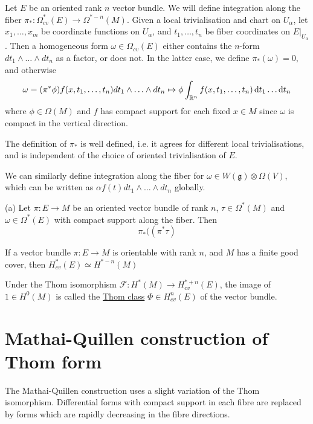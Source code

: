 Let $E$ be an oriented rank  $n$ vector bundle. We will define integration along
the fiber $\pi_* : \Omega^*_{cv}(E) \to \Omega^{*-n}(M)$. 
Given a local trivialisation and chart on $U_\alpha$, let $x_1,\ldots,x_m$ be 
coordinate functions on $U_\alpha$, and  $t_1,\ldots,t_n$ be fiber coordinates
on $E|_{U_{\alpha}}$. Then a homogeneous form $\omega\in \Omega_{cv}(E)$ either 
contains the $n$-form  $dt_1\wedge \ldots\wedge dt_n$ as a factor, or does not. 
In the latter case, we define $\pi_*(\omega) = 0$, and otherwise 
\[
\omega = (\pi^*\phi)f(x,t_1,\ldots,t_n)dt_1\wedge\ldots\wedge dt_n
\mapsto \phi\int_{\mathbb{R}^n} f(x,t_1,\ldots,t_n) \odif{t_1}\ldots\odif{t_n}
\] 
where $\phi\in\Omega(M)$ and  $f$ has compact support for each fixed  $x\in M$
since  $\omega$ is compact in the vertical direction. 

The definition of $\pi_*$ is well defined, i.e. it agrees for different local
trivialisations, and is independent of the choice of oriented trivialisation of
 $E$. %


We can similarly define integration along the fiber for $\omega\in
W(\mathfrak{g})\otimes \Omega(V)$, which can be written as $\alpha
f(t)dt_1\wedge\ldots\wedge dt_n$ globally.


\begin{prop} %
	(a) Let $\pi : E \to M$ be an oriented vector bundle of rank  $n$,
	$\tau\in\Omega^*(M)$ and  $\omega\in \Omega^*(E)$ with compact support
	along the fiber. Then 
	 \[
	\pi_*((\pi^*\tau)  
	\] 
\end{prop}
\begin{thm} %
	If a vector bundle $\pi: E \to M$ is orientable with rank $n$, and $M$ has a
	finite good cover, then 
	 $H^*_{cv}(E) \simeq H^{*-n}(M)$
\end{thm}
\begin{defn}
	Under the Thom isomorphism $\mathcal{F}:H^*(M)\to H_{cv}^{*+n}(E)$, the
	image of $1\in H^0(M)$ is called the \underline{Thom class}  $\Phi\in
	H_{cv}^n(E)$ of the vector bundle.
\end{defn}



\section{Mathai-Quillen construction of Thom form}
\label{section:mq_formula}
The Mathai-Quillen construction uses a slight variation of the Thom isomorphism.
Differential forms with compact support in each fibre are replaced by forms
which are rapidly decreasing in the fibre directions. 

